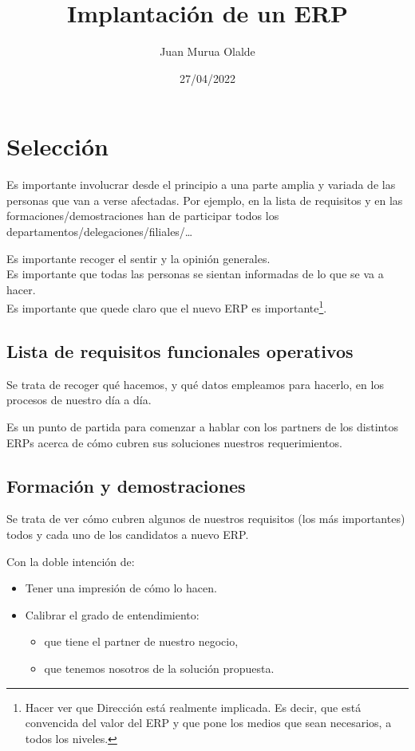 \documentclass[spanish,12pt,a4paper,final,oneside]{article}
\title{Implantación de un ERP}
\author{Juan Murua Olalde}
\date{27/04/2022}
\begin{document}
\begin{center}\begin{LARGE}
\MyTitle
\end{LARGE}\end{center}
\begin{footnotesize}
\end{footnotesize}

\hypersetup{linkcolor=black}

\vspace{1cm}


\section{Selección}
Es importante involucrar desde el principio a una parte amplia y variada de las personas que van a verse afectadas. Por ejemplo, en la lista de requisitos y en las formaciones/demostraciones han de participar todos los departamentos/delegaciones/filiales/\ldots

Es importante recoger el sentir y la opinión generales.
\\Es importante que todas las personas se sientan informadas de lo que se va a hacer.
\\Es importante que quede claro que el nuevo ERP es importante\footnote{ Hacer ver que Dirección está realmente implicada. Es decir, que está convencida del valor del ERP y que pone los medios que sean necesarios, a todos los niveles.}. 


\subsection{Lista de requisitos funcionales operativos}
Se trata de recoger qué hacemos, y qué datos empleamos para hacerlo, en los procesos de nuestro día a día.

Es un punto de partida para comenzar a hablar con los partners de los distintos ERPs acerca de cómo cubren sus soluciones nuestros requerimientos.

\subsection{Formación y demostraciones}
Se trata de ver cómo cubren algunos de nuestros requisitos (los más importantes) todos y cada uno de los candidatos a nuevo ERP.

Con la doble intención de:
\begin{itemize}

\item Tener una impresión de cómo lo hacen.

\item Calibrar el grado de entendimiento:
\begin{itemize}
\item que tiene el partner de nuestro negocio,
\item que tenemos nosotros de la solución propuesta.
\end{itemize}

\end{itemize}
\end{document}
